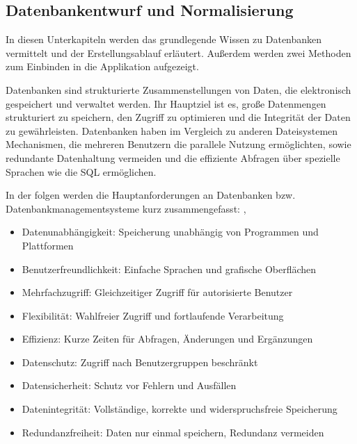 \subsection{Datenbankentwurf und Normalisierung}
\label{subsec:datenbankentwurf-und-normalisierung}
In diesen Unterkapiteln werden das grundlegende Wissen zu Datenbanken vermittelt und der Erstellungsablauf erläutert.
Außerdem werden zwei Methoden zum Einbinden in die Applikation aufgezeigt.

Datenbanken sind strukturierte Zusammenstellungen von Daten, die elektronisch gespeichert und verwaltet werden.
Ihr Hauptziel ist es, große Datenmengen strukturiert zu speichern, den Zugriff zu optimieren und die Integrität der Daten zu gewährleisten.
Datenbanken haben im Vergleich zu anderen Dateisystemen Mechanismen, die mehreren Benutzern die parallele Nutzung ermöglichten,
sowie redundante Datenhaltung vermeiden und die effiziente Abfragen über spezielle Sprachen wie die \ac{SQL} ermöglichen.\cite*[6]{Fuchs2021}

In der folgen werden die Hauptanforderungen an Datenbanken bzw. Datenbankmanagementsysteme kurz zusammengefasst:  \cite*[7]{Herrmann2018},\cite*[6]{Fuchs2021}
\begin{itemize}
\item Datenunabhängigkeit: Speicherung unabhängig von Programmen und Plattformen
\item
Benutzerfreundlichkeit: Einfache Sprachen und grafische Oberflächen
\item
Mehrfachzugriff: Gleichzeitiger Zugriff für autorisierte Benutzer
\item
Flexibilität: Wahlfreier Zugriff und fortlaufende Verarbeitung
\item
Effizienz: Kurze Zeiten für Abfragen, Änderungen und Ergänzungen
\item
Datenschutz: Zugriff nach Benutzergruppen beschränkt
\item
Datensicherheit: Schutz vor Fehlern und Ausfällen
\item
Datenintegrität: Vollständige, korrekte und widerspruchsfreie Speicherung
\item
Redundanzfreiheit: Daten nur einmal speichern, Redundanz vermeiden
\end{itemize}



